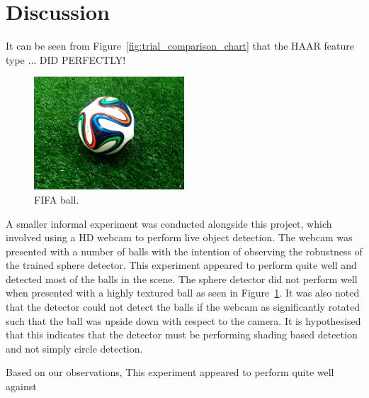 \documentclass{llncs}
\begin{document}
	\section{Discussion} {

		It can be seen from Figure~\ref{fig:trial_comparison_chart} that the HAAR feature type ... DID PERFECTLY!

		\begin{figure}
			\centering
			\includegraphics[width=0.5\textwidth]{images/fifa_ball}
			\caption{FIFA ball.}
			\label{fig:fifa_ball}
		\end{figure}

		A smaller informal experiment was conducted alongside this project, which involved using a HD webcam to perform live object detection. The webcam was presented with a number of balls with the intention of observing the robustness of the trained sphere detector. This experiment appeared to perform quite well and detected most of the balls in the scene. The sphere detector did not perform well when presented with a highly textured ball as seen in Figure~\ref{}. It was also noted that the detector could not detect the balls if the webcam as significantly rotated such that the ball was upside down with respect to the camera. It is hypothesised that this indicates that the detector must be performing shading based detection and not simply circle detection.


		Based on our observations,
		This experiment appeared to perform quite well against
	}
\end{document}
